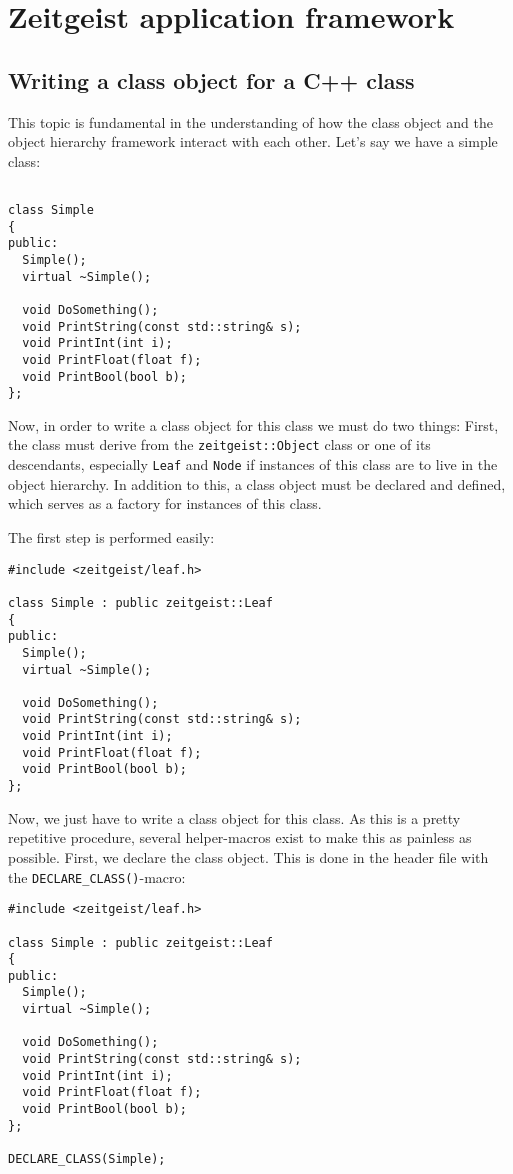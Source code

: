 \chapter{Zeitgeist application framework}

\section{Writing a class object for a C++ class}
\label{sec:classobj}

This topic is fundamental in the understanding of how the class object
and the object hierarchy framework interact with each other. Let's say
we have a simple class:

\begin{verbatim}

class Simple
{
public:
  Simple();
  virtual ~Simple();
  
  void DoSomething();
  void PrintString(const std::string& s);
  void PrintInt(int i);
  void PrintFloat(float f);
  void PrintBool(bool b);
};

\end{verbatim}

Now, in order to write a class object for this class we must do two
things: First, the class must derive from the
\texttt{zeitgeist::Object} class or one of its descendants,
especially \texttt{Leaf} and \texttt{Node} if instances of this class
are to live in the object hierarchy. In addition to this, a class
object must be declared and defined, which serves as a factory for
instances of this class.

The first step is performed easily:

\begin{verbatim}
#include <zeitgeist/leaf.h>

class Simple : public zeitgeist::Leaf
{
public:
  Simple();
  virtual ~Simple();
  
  void DoSomething();
  void PrintString(const std::string& s);
  void PrintInt(int i);
  void PrintFloat(float f);
  void PrintBool(bool b);
};
\end{verbatim}

Now, we just have to write a class object for this class. As this is a
pretty repetitive procedure, several helper-macros exist to make this
as painless as possible. First, we declare the class object. This is
done in the header file with the \texttt{DECLARE\_CLASS()}-macro:

\begin{verbatim}
#include <zeitgeist/leaf.h>

class Simple : public zeitgeist::Leaf
{
public:
  Simple();
  virtual ~Simple();
  
  void DoSomething();
  void PrintString(const std::string& s);
  void PrintInt(int i);
  void PrintFloat(float f);
  void PrintBool(bool b);
};

DECLARE_CLASS(Simple);
\end{verbatim}


